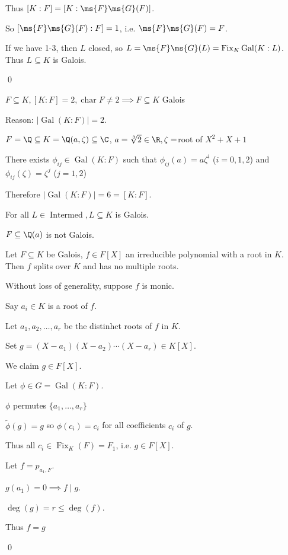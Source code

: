 \documentclass[x11names,reqno,14pt]{extarticle}
\DeclareMathOperator{\Gal}{Gal}
\DeclareMathOperator{\Fix}{Fix}
\DeclareMathOperator{\Intermed}{Intermed}
\DeclareMathOperator{\Char}{char}
\begin{document}
Thus $[K:F] = [K:\ms{F}\ms{G}(F)]$. 

So $[\ms{F}\ms{G}(F):F] = 1$, i.e. $\ms{F}\ms{G}(F) = F$. 

If we have 1-3, then $L$ closed, so $L = \ms{F}\ms{G}(L) = \Fix_K\Gal(K:L)$. Thus $L \subseteq K$ is Galois.

\qed

\exm

$F \subseteq K, [K:F] = 2, \Char F \neq 2 \implies F \subseteq K$ Galois

Reason: $|\Gal(K:F)| = 2$. 

$F = \Q \subseteq K = \Q(a,\zeta)\subseteq\C$, $a = \sqrt[3]{2}\in\R,\zeta = $root of $X^2 + X + 1$

There exists $\phi_{ij}\in\Gal(K:F)$ such that $\phi_{ij}(a) = a\zeta^i$ ($i = 0, 1, 2$) and $\phi_{ij}(\zeta) = \zeta^j$ ($j = 1, 2$)

Therefore $|\Gal(K:F)| = 6 = [K:F]$. 

For all $L \in \Intermed, L \subseteq K$ is Galois. 

$F \subseteq \Q(a)$ is not Galois. 

\lem

Let $F \subseteq K$ be Galois, $f \in F[X]$ an irreducible polynomial with a root in $K$. Then $f$ splits over $K$ and has no multiple roots. 

\proof

Without loss of generality, suppose $f$ is monic. 

Say $a_i \in K$ is a root of $f$. 

Let $a_1, a_2, \dots, a_r$ be the distinhct roots of $f$ in $K$. 

Set $g = (X - a_1)(X - a_2)\cdots(X - a_r) \in K[X]$. 

We claim $g\in F[X]$. 

Let $\phi\in G = \Gal(K:F)$. 

$\phi$ permutes $\{a_1,\dots, a_r\}$

$\tilde{\phi}(g) = g$ so $\phi(c_i) = c_i$ for all coefficients $c_i$ of $g$. 

Thus all $c_i \in \Fix_K(F) = F_1$, i.e. $g\in F[X]$. 

Let $f = p_{a_1, F}$. 

$g(a_1) = 0 \implies f \mid g$. 

$\deg(g) = r \leq \deg (f)$. 

Thus $f = g$

\qed

\cor 
\end{document}
